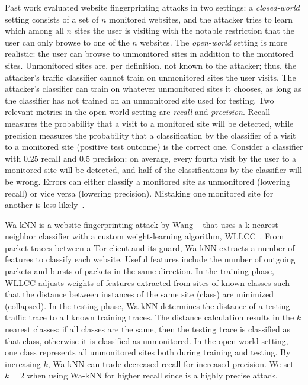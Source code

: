 Past work evaluated website fingerprinting attacks in two settings:
a {\em closed-world} setting consists of a set of $n$ {monitored}
websites, and the attacker tries to learn which among all $n$ sites the
user is visiting with the notable restriction that the user can only
browse to one of the $n$ websites.  The {\em open-world} setting is more
realistic: the user can browse to {unmonitored} sites in addition to the
monitored sites. Unmonitored sites are, per definition, not known to the
attacker; thus, the attacker's traffic classifier cannot train on unmonitored
sites the user visits. The attacker's classifier can train on
whatever unmonitored sites it chooses, as long as the
classifier has not trained on an unmonitored site used for testing.
Two relevant metrics
in the open-world
setting are \emph{recall} and \emph{precision}.
Recall measures the probability that
a visit to a monitored site will be detected, while precision measures
the probability that a classification by the classifier of a visit to a
monitored site (positive test outcome) is the correct one. Consider a
classifier with 0.25 recall and 0.5 precision: on average, every fourth
visit by the user to a monitored site will be detected, and half of the
classifications by the classifier will be wrong. Errors can
either classify a monitored site as
unmonitored (lowering recall) or vice versa (lowering precision).
Mistaking one monitored site for another is less likely~\cite{Wang2015a}.

Wa-kNN is a website fingerprinting attack by Wang \ea~\cite{Wang2014a}
that uses a k-nearest neighbor classifier with a custom weight-learning
algorithm, WLLCC~\cite[\S~3.2.5]{Wang2015a}.  From {packet traces}
between a Tor client and its guard, Wa-kNN extracts a number of {features}
to classify each website.  Useful features include
the number of outgoing packets and bursts of packets in the same direction.
In the training phase, WLLCC adjusts {weights} of features extracted from
sites of known classes such that the {distance} between instances of the
same site (class) are minimized (collapsed).
In the testing phase, Wa-kNN determines the distance of a testing traffic trace
to all known training traces.  The distance calculation results in the $k$
nearest classes: if all classes are the same, then the testing trace is
classified as that class, otherwise it is classified as unmonitored.
In the open-world setting, one class represents all unmonitored sites both
during training and testing.  By increasing $k$, Wa-kNN can trade decreased
recall for increased precision.  We set $k=2$ when using Wa-kNN for higher
recall since \name is a highly precise attack.

